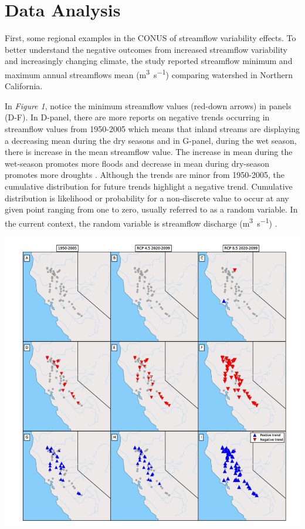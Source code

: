 \documentclass[a4paper,man,biblatex]{apa7}
\begin{document}
\section{Data Analysis}  
\par First, some regional examples in the CONUS of streamflow variability effects. To better understand the negative outcomes from increased streamflow variability and increasingly changing climate, the \textcite{mallakpour_2018} study reported streamflow minimum and maximum annual streamflows mean (\si{\cubic\meter\per\second}) comparing watershed in Northern California.\\ 
\par In \textit{Figure 1}, notice the minimum streamflow values (red-down arrows) in panels (D-F). In D-panel, there are more reports on negative trends occurring in streamflow values from 1950-2005 which means that inland streams are displaying a decreasing mean during the dry seasons and in G-panel, during the wet season, there is increase in the mean streamflow value. The increase in mean during the wet-season promotes more floods and decrease in mean during dry-season promotes more droughts \autocite{mallakpour_2018}. Although the trends are minor from 1950-2005, the cumulative distribution for future trends highlight a negative trend. Cumulative distribution is likelihood or probability for a non-discrete value to occur at any given point ranging from one to zero, usually referred to as a random variable. In the current context, the random variable is streamflow discharge (\si{\cubic\meter\per\second}) \autocite{cdf_def}.\\
 \begin{minipage}{0.65\linewidth}   
     \includegraphics[scale=0.35]{stream_flow_cali.png}
     \label{fig:streamflow_trend}
\end{minipage}
\end{document}
